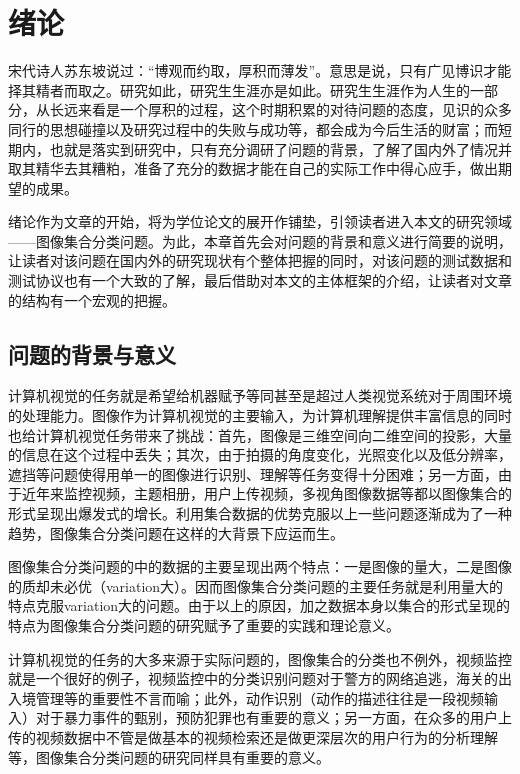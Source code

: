 \chapter{绪\hspace{1em}论}
\label{cha:intro}
宋代诗人苏东坡说过：“博观而约取，厚积而薄发”。意思是说，只有广见博识才能择其精者而取之。研究如此，研究生生涯亦是如此。研究生生涯作为人生的一部分，从长远来看是一个厚积的过程，这个时期积累的对待问题的态度，见识的众多同行的思想碰撞以及研究过程中的失败与成功等，都会成为今后生活的财富；而短期内，也就是落实到研究中，只有充分调研了问题的背景，了解了国内外了情况并取其精华去其糟粕，准备了充分的数据才能在自己的实际工作中得心应手，做出期望的成果。

绪论作为文章的开始，将为学位论文的展开作铺垫，引领读者进入本文的研究领域——图像集合分类问题。为此，本章首先会对问题的背景和意义进行简要的说明，让读者对该问题在国内外的研究现状有个整体把握的同时，对该问题的测试数据和测试协议也有一个大致的了解，最后借助对本文的主体框架的介绍，让读者对文章的结构有一个宏观的把握。
\section{问题的背景与意义}
\label{sec:background}
计算机视觉的任务就是希望给机器赋予等同甚至是超过人类视觉系统对于周围环境的处理能力。图像作为计算机视觉的主要输入，为计算机理解提供丰富信息的同时也给计算机视觉任务带来了挑战：首先，图像是三维空间向二维空间的投影，大量的信息在这个过程中丢失；其次，由于拍摄的角度变化，光照变化以及低分辨率，遮挡等问题使得用单一的图像进行识别、理解等任务变得十分困难；另一方面，由于近年来监控视频，主题相册，用户上传视频，多视角图像数据等都以图像集合的形式呈现出爆发式的增长。利用集合数据的优势克服以上一些问题逐渐成为了一种趋势，图像集合分类问题在这样的大背景下应运而生。

图像集合分类问题的中的数据的主要呈现出两个特点：一是图像的量大，二是图像的质却未必优（variation大）。因而图像集合分类问题的主要任务就是利用量大的特点克服variation大的问题。由于以上的原因，加之数据本身以集合的形式呈现的特点为图像集合分类问题的研究赋予了重要的实践和理论意义。

计算机视觉的任务的大多来源于实际问题的，图像集合的分类也不例外，视频监控就是一个很好的例子，视频监控中的分类识别问题对于警方的网络追逃，海关的出入境管理等的重要性不言而喻；此外，动作识别（动作的描述往往是一段视频输入）对于暴力事件的甄别，预防犯罪也有重要的意义；另一方面，在众多的用户上传的视频数据中不管是做基本的视频检索还是做更深层次的用户行为的分析理解等，图像集合分类问题的研究同样具有重要的意义。

